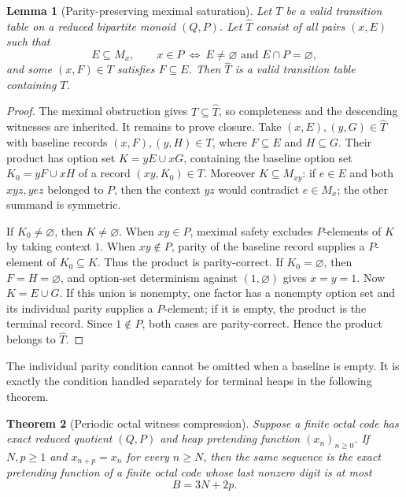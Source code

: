 \documentclass[11pt]{article}
\newtheorem{theorem}{Theorem}[section]
\newtheorem{lemma}[theorem]{Lemma}
\theoremstyle{definition}
\theoremstyle{remark}
\begin{document}
\begin{lemma}[Parity-preserving meximal saturation]
\label{lem:parity-saturation}
Let $T$ be a valid transition table on a reduced bipartite monoid $(Q,P)$.
Let $\widehat T$ consist of all pairs $(x,E)$ such that
\[
 E\subseteq M_x,\qquad
 x\in P\ \Longleftrightarrow\ E\ne\varnothing
       \text{ and }E\cap P=\varnothing,
\]
and some $(x,F)\in T$ satisfies $F\subseteq E$.
Then $\widehat T$ is a valid transition table containing $T$.
\end{lemma}

\begin{proof}
The meximal obstruction gives $T\subseteq\widehat T$, so completeness and
the descending witnesses are inherited.  It remains to prove closure.
Take $(x,E),(y,G)\in\widehat T$ with baseline records
$(x,F),(y,H)\in T$, where $F\subseteq E$ and $H\subseteq G$.
Their product has option set $K=yE\cup xG$, containing the baseline option
set $K_0=yF\cup xH$ of a record $(xy,K_0)\in T$.
Moreover $K\subseteq M_{xy}$: if $e\in E$ and both $xyz,yez$ belonged to
$P$, then the context $yz$ would contradict $e\in M_x$; the other summand
is symmetric.

If $K_0\ne\varnothing$, then $K\ne\varnothing$.
When $xy\in P$, meximal safety excludes $P$-elements of $K$ by taking
context $1$.  When $xy\notin P$, parity of the baseline record supplies
a $P$-element of $K_0\subseteq K$.  Thus the product is parity-correct.
If $K_0=\varnothing$, then $F=H=\varnothing$, and option-set determinism
against $(1,\varnothing)$ gives $x=y=1$.  Now $K=E\cup G$.
If this union is nonempty, one factor has a nonempty option set and its
individual parity supplies a $P$-element; if it is empty, the product is
the terminal record.  Since $1\notin P$, both cases are parity-correct.
Hence the product belongs to $\widehat T$.
\end{proof}

The individual parity condition cannot be omitted when a baseline is
empty.  It is exactly the condition handled separately for terminal heaps
in the following theorem.

\begin{theorem}[Periodic octal witness compression]
\label{thm:periodic-compression}
Suppose a finite octal code has exact reduced quotient $(Q,P)$ and heap
pretending function $(x_n)_{n\ge0}$.  If $N,p\ge1$ and
$x_{n+p}=x_n$ for every $n\ge N$, then the same sequence is the exact
pretending function of a finite octal code whose last nonzero digit is at
most
\[
 B=3N+2p.
\]
\end{theorem}
\end{document}
